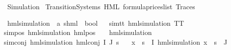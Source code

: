 %
\begin{isabellebody}%
%
%
\isadelimtheory
%
\endisadelimtheory
%
\isatagtheory
{}\isamarkupfalse%
\ Simulation\isanewline
{}\ Transition{\isacharunderscore}{\kern0pt}Systems\ HML\ formula{\isacharunderscore}{\kern0pt}prices{\isacharunderscore}{\kern0pt}list\ Traces\isanewline
{}%
\endisatagtheory
{\isafoldtheory}%
%
\isadelimtheory
%
\endisadelimtheory
%
\isadelimdocument
%
\endisadelimdocument
%
\isatagdocument
%
\isamarkuptrue%
%
\endisatagdocument
{\isafolddocument}%
%
\isadelimdocument
%
\endisadelimdocument
%
\begin{isamarkuptext}%
%
\end{isamarkuptext}\isamarkuptrue%
\isamarkupfalse%
\ hml{\isacharunderscore}{\kern0pt}simulation\ {\isacharcolon}{\kern0pt}{\isacharcolon}{\kern0pt}\ {\isachardoublequoteopen}{\isacharparenleft}{\kern0pt}{\isacharprime}{\kern0pt}a{\isacharcomma}{\kern0pt}\ {\isacharprime}{\kern0pt}s{\isacharparenright}{\kern0pt}hml\ {\isasymRightarrow}\ bool{\isachardoublequoteclose}\isanewline
\ \ \isanewline
sim{\isacharunderscore}{\kern0pt}tt{\isacharcolon}{\kern0pt}\ {\isachardoublequoteopen}hml{\isacharunderscore}{\kern0pt}simulation\ TT{\isachardoublequoteclose}\ {\isacharbar}{\kern0pt}\isanewline
sim{\isacharunderscore}{\kern0pt}pos{\isacharcolon}{\kern0pt}\ {\isachardoublequoteopen}hml{\isacharunderscore}{\kern0pt}simulation\ {\isacharparenleft}{\kern0pt}hml{\isacharunderscore}{\kern0pt}pos\ {\isasymalpha}\ {\isasymphi}{\isacharparenright}{\kern0pt}{\isachardoublequoteclose}\ \ {\isachardoublequoteopen}hml{\isacharunderscore}{\kern0pt}simulation\ {\isasymphi}{\isachardoublequoteclose}{\isacharbar}{\kern0pt}\isanewline
sim{\isacharunderscore}{\kern0pt}conj{\isacharcolon}{\kern0pt}\ {\isachardoublequoteopen}hml{\isacharunderscore}{\kern0pt}simulation\ {\isacharparenleft}{\kern0pt}hml{\isacharunderscore}{\kern0pt}conj\ I\ J\ {\isasympsi}s{\isacharparenright}{\kern0pt}\ {\isachardoublequoteclose}\ \isanewline
{}\ {\isachardoublequoteopen}{\isacharparenleft}{\kern0pt}{\isasymforall}x\ {\isasymin}\ {\isacharparenleft}{\kern0pt}{\isasympsi}s\ {\isacharbackquote}{\kern0pt}\ I{\isacharparenright}{\kern0pt}{\isachardot}{\kern0pt}\ hml{\isacharunderscore}{\kern0pt}simulation\ x{\isacharparenright}{\kern0pt}\ {\isasymand}\ {\isacharparenleft}{\kern0pt}{\isasympsi}s\ {\isacharbackquote}{\kern0pt}\ J\ {\isacharequal}{\kern0pt}\ {\isacharbraceleft}{\kern0pt}{\isacharbraceright}{\kern0pt}{\isacharparenright}{\kern0pt}{\isachardoublequoteclose}\isanewline

\end{isabellebody}

